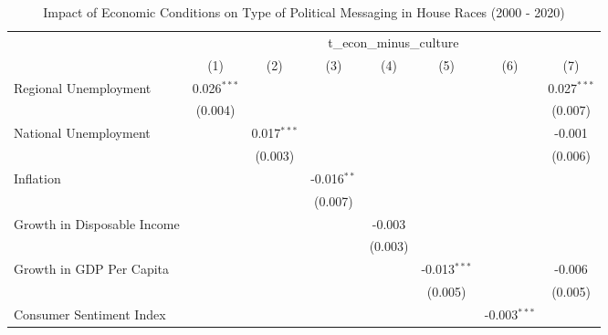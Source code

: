 
\begin{table}[htbp]
   \caption{Impact of Economic Conditions on Type of Political Messaging in House Races (2000 - 2020)}
   \bigskip
   \centering
   \begin{tabular}{lccccccc}
      \toprule
       & \multicolumn{7}{c}{t\_econ\_minus\_culture}\\
                                  & (1)           & (2)           & (3)           & (4)           & (5)            & (6)            & (7)\\  
      \midrule 
      Regional Unemployment       & 0.026$^{***}$ &               &               &               &                &                & 0.027$^{***}$\\   
                                  & (0.004)       &               &               &               &                &                & (0.007)\\   
      National Unemployment       &               & 0.017$^{***}$ &               &               &                &                & -0.001\\   
                                  &               & (0.003)       &               &               &                &                & (0.006)\\   
      Inflation                   &               &               & -0.016$^{**}$ &               &                &                &   \\   
                                  &               &               & (0.007)       &               &                &                &   \\   
      Growth in Disposable Income &               &               &               & -0.003        &                &                &   \\   
                                  &               &               &               & (0.003)       &                &                &   \\   
      Growth in GDP Per Capita    &               &               &               &               & -0.013$^{***}$ &                & -0.006\\   
                                  &               &               &               &               & (0.005)        &                & (0.005)\\   
      Consumer Sentiment Index    &               &               &               &               &                & -0.003$^{***}$ &   \\   

\end{tabular}
\end{table}
